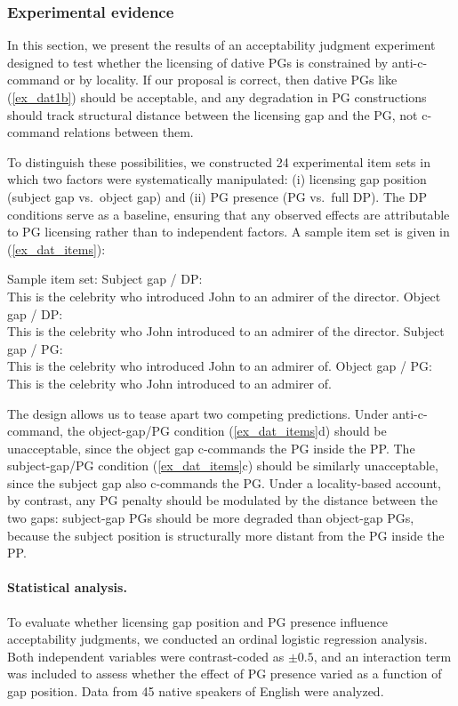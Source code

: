 \documentclass[12pt]{article}
\begin{document}
\subsubsection{Experimental evidence}

In this section, we present the results of an acceptability judgment experiment designed to test whether the licensing of dative PGs is constrained by anti-c-command or by locality. If our proposal is correct, then dative PGs like (\ref{ex_dat1b}) should be acceptable, and any degradation in PG constructions should track structural distance between the licensing gap and the PG, not c-command relations between them.

To distinguish these possibilities, we constructed 24 experimental item sets in which two factors were systematically manipulated: (i) licensing gap position (subject gap vs.\ object gap) and (ii) PG presence (PG vs.\ full DP). The DP conditions serve as a baseline, ensuring that any observed effects are attributable to PG licensing rather than to independent factors. A sample item set is given in (\ref{ex_dat_items}):

\pex \label{ex_dat_items} Sample item set:
    \a Subject gap / DP:\\
    This is the celebrity who introduced John to an admirer of the director.
    \a Object gap / DP:\\
    This is the celebrity who John introduced to an admirer of the director.
    \a Subject gap / PG:\\
    This is the celebrity who introduced John to an admirer of.
    \a Object gap / PG:\\
    This is the celebrity who John introduced to an admirer of.
\xe

\noindent
The design allows us to tease apart two competing predictions. Under anti-c-command, the object-gap/PG condition (\ref{ex_dat_items}d) should be unacceptable, since the object gap c-commands the PG inside the PP. The subject-gap/PG condition (\ref{ex_dat_items}c) should be similarly unacceptable, since the subject gap also c-commands the PG. Under a locality-based account, by contrast, any PG penalty should be modulated by the distance between the two gaps: subject-gap PGs should be more degraded than object-gap PGs, because the subject position is structurally more distant from the PG inside the PP.

\paragraph{Statistical analysis.} To evaluate whether licensing gap position and PG presence influence acceptability judgments, we conducted an ordinal logistic regression analysis. Both independent variables were contrast-coded as $\pm0.5$, and an interaction term was included to assess whether the effect of PG presence varied as a function of gap position. Data from 45 native speakers of English were analyzed.
\end{document}
